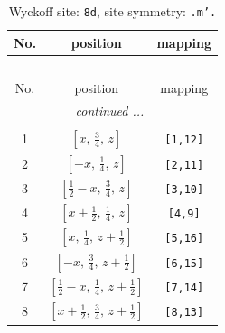 \documentclass[fleqn,8pt]{jsarticle}
\begin{document}
\begin{longtable}{ccc}
\caption{Wyckoff site: {\tt 8d}, site symmetry: {\tt .m'.}}
 \\
 \hline \hline
No. & position & mapping \\ \hline \endfirsthead

\multicolumn{2}{l}{\tablename\ \thetable{}} \\
 \hline \hline
No. & position & mapping \\ \hline \endhead

 \hline \hline
\multicolumn{2}{r}{\footnotesize\it continued ...} \\ \endfoot

 \hline \hline
\multicolumn{2}{r}{} \\ \endlastfoot

1 & $\left[ x,\, \frac{3}{4},\, z \right]$ & {\tt [1,12]} \\ \hline
2 & $\left[ - x,\, \frac{1}{4},\, z \right]$ & {\tt [2,11]} \\ \hline
3 & $\left[ \frac{1}{2} - x,\, \frac{3}{4},\, z \right]$ & {\tt [3,10]} \\ \hline
4 & $\left[ x + \frac{1}{2},\, \frac{1}{4},\, z \right]$ & {\tt [4,9]} \\ \hline
5 & $\left[ x,\, \frac{1}{4},\, z + \frac{1}{2} \right]$ & {\tt [5,16]} \\ \hline
6 & $\left[ - x,\, \frac{3}{4},\, z + \frac{1}{2} \right]$ & {\tt [6,15]} \\ \hline
7 & $\left[ \frac{1}{2} - x,\, \frac{1}{4},\, z + \frac{1}{2} \right]$ & {\tt [7,14]} \\ \hline
8 & $\left[ x + \frac{1}{2},\, \frac{3}{4},\, z + \frac{1}{2} \right]$ & {\tt [8,13]} \\
\end{longtable}
\renewcommand{\arraystretch}{1.2}
\end{document}
